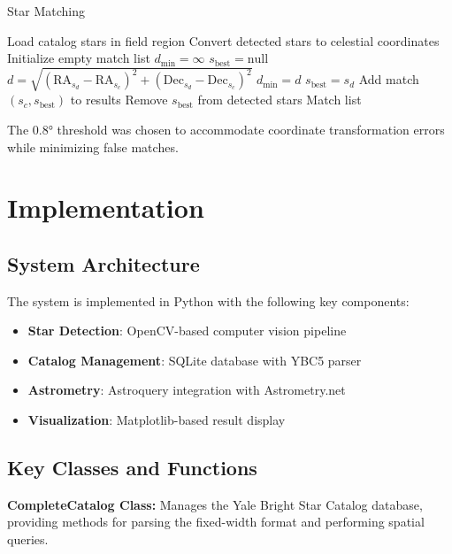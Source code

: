 \documentclass[11pt,a4paper]{article}
\begin{document}
\begin{algorithm}
\caption{Star Matching}
\begin{algorithmic}[1]
\STATE Load catalog stars in field region
\STATE Convert detected stars to celestial coordinates
\STATE Initialize empty match list
    \STATE $d_{\min} = \infty$
    \STATE $s_{\text{best}} = \text{null}$
        \STATE $d = \sqrt{(\text{RA}_{s_d} - \text{RA}_{s_c})^2 + (\text{Dec}_{s_d} - \text{Dec}_{s_c})^2}$
            \STATE $d_{\min} = d$
            \STATE $s_{\text{best}} = s_d$
        \ENDIF
    \ENDFOR
        \STATE Add match $(s_c, s_{\text{best}})$ to results
        \STATE Remove $s_{\text{best}}$ from detected stars
    \ENDIF
\ENDFOR
\RETURN Match list
\end{algorithmic}
\end{algorithm}

The 0.8° threshold was chosen to accommodate coordinate transformation errors while minimizing false matches.

\section{Implementation}

\subsection{System Architecture}

The system is implemented in Python with the following key components:

\begin{itemize}
    \item \textbf{Star Detection}: OpenCV-based computer vision pipeline
    \item \textbf{Catalog Management}: SQLite database with YBC5 parser
    \item \textbf{Astrometry}: Astroquery integration with Astrometry.net
    \item \textbf{Visualization}: Matplotlib-based result display
\end{itemize}

\subsection{Key Classes and Functions}

\textbf{CompleteCatalog Class:}
Manages the Yale Bright Star Catalog database, providing methods for parsing the fixed-width format and performing spatial queries.
\end{document}
